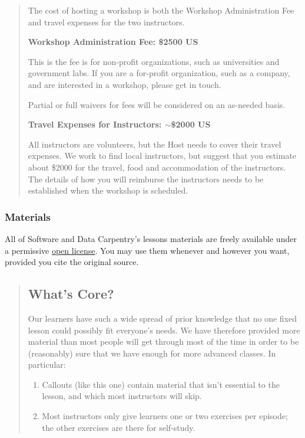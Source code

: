 \begin{quotation}   %
The cost of hosting a workshop is both the Workshop Administration Fee and travel expenses for the two instructors.

\textbf{Workshop Administration Fee: \$2500 US}

This is the fee is for non-profit organizations, such as universities and government labs.
If you are a for-profit organization, such as a company, and are interested in a workshop, please get in touch.

Partial or full waivers for fees will be considered on an as-needed basis.

\textbf{Travel Expenses for Instructors: \ensuremath{\sim}\$2000 US}

All instructors are volunteers, but the Host needs to cover their travel expenses.
We work to find local instructors,
but suggest that you estimate about \$2000 for the travel, food and accommodation of the instructors.
The details of how you will reimburse the instructors needs to be established when the workshop is scheduled.
\end{quotation}   %

\subsubsection*{Materials}

All of Software and Data Carpentry's lessons materials are freely available
under a permissive \href{\{\{ page.root \}\}/license/}{open license}.
You may use them whenever and however you want,
provided you cite the original source.

\begin{quotation}   %
\subsection*{What's Core?}

Our learners have such a wide spread of prior knowledge
that no one fixed lesson could possibly fit everyone's needs.
We have therefore provided more material than most people will get through most of the time
in order to be (reasonably) sure that we have enough for more advanced classes.
In particular:

\begin{enumerate}
\item Callouts (like this one) contain material that isn't essential to the lesson,
and which most instructors will skip.
\item Most instructors only give learners one or two exercises per episode;
the other exercises are there for self-study.
\end{enumerate}
\end{quotation}   %

